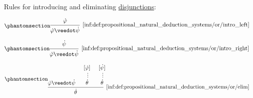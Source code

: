 \begin{definition}
\begin{thmenum}
     Rules for introducing and eliminating \hyperref[def:propositional_alphabet/connectives/disjunction]{disjunctions}:
    \begin{paracol}{3}
      \begin{nthcolumn}{0}
        \ParacolAlignmentHack
        \begin{equation*}\taglabel[\ensuremath{ \vee_{+L} }]{inf:def:propositional_natural_deduction_systems/or/intro_left}
          \begin{prooftree}
            \hypo{ \syn\varphi }
            \infer1[\ref{inf:def:propositional_natural_deduction_systems/or/intro_left}]{ \syn\varphi \synvee \syn\psi }
          \end{prooftree}
        \end{equation*}
      \end{nthcolumn}

      \begin{nthcolumn}{1}
        \ParacolAlignmentHack
        \begin{equation*}\taglabel[\ensuremath{ \vee_{+R} }]{inf:def:propositional_natural_deduction_systems/or/intro_right}
          \begin{prooftree}
            \hypo{ \syn\psi }
            \infer1[\ref{inf:def:propositional_natural_deduction_systems/or/intro_right}]{ \syn\varphi \synvee \syn\psi }
          \end{prooftree}
        \end{equation*}
      \end{nthcolumn}

      \begin{nthcolumn}{2}
        \ParacolAlignmentHack
        \begin{equation*}\taglabel[\ensuremath{ \vee_- }]{inf:def:propositional_natural_deduction_systems/or/elim}
          \begin{prooftree}
            \hypo{ \syn\varphi \synvee \syn\psi }
            \hypo{ [\syn\varphi] }
            \ellipsis {} { \syn\theta }
            \hypo{ [\syn\psi] }
            \ellipsis {} { \syn\theta }
            \infer3[\ref{inf:def:propositional_natural_deduction_systems/or/elim}]{ \syn\theta }
          \end{prooftree}
        \end{equation*}
      \end{nthcolumn}
    \end{paracol}


\end{thmenum}
\end{definition}
